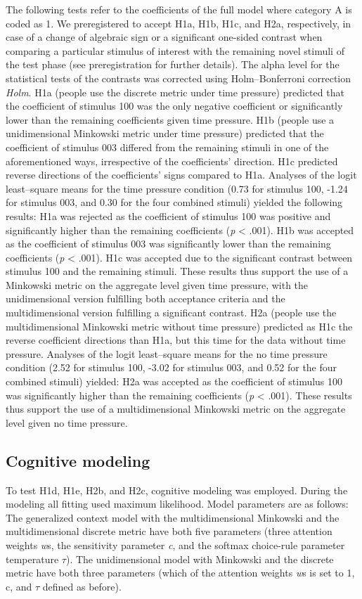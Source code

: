 \documentclass[a4paper,man,natbib]{apa6}
\begin{document}
The following tests refer to the coefficients of the full model where category A is coded as 1. We preregistered to accept H1a, H1b, H1c, and H2a, respectively, in case of a change of algebraic sign or a significant one-sided contrast when comparing a particular stimulus of interest with the remaining novel stimuli of the test phase (see preregistration for further details). The alpha level for the statistical tests of the contrasts was corrected using Holm--Bonferroni correction \textit{Holm}. H1a (people use the discrete metric under time pressure) predicted that the coefficient of stimulus 100 was the only negative coefficient or significantly lower than the remaining coefficients given time pressure. H1b (people use a unidimensional Minkowski metric under time pressure) predicted that the coefficient of stimulus 003 differed from the remaining stimuli in one of the aforementioned ways, irrespective of the coefficients' direction. H1c predicted reverse directions of the coefficients' signs compared to H1a. Analyses of the logit least--square means for the time pressure condition (0.73 for stimulus 100, -1.24 for stimulus 003, and 0.30 for the four combined stimuli) yielded the following results: H1a was rejected as the coefficient of stimulus 100 was positive and significantly higher than the remaining coefficients (\textit{p} < .001). H1b was accepted as the coefficient of stimulus 003 was significantly lower than the remaining coefficients (\textit{p} < .001). H1c was accepted due to the significant contrast between stimulus 100 and the remaining stimuli. These results thus support the use of a Minkowski metric on the aggregate level given time pressure, with the unidimensional version fulfilling both acceptance criteria and the multidimensional version fulfilling a significant contrast. H2a (people use the multidimensional Minkowski metric without time pressure) predicted as H1c the reverse coefficient directions than H1a, but this time for the data without time pressure. Analyses of the logit least--square means for the no time pressure condition (2.52 for stimulus 100, -3.02 for stimulus 003, and 0.52 for the four combined stimuli) yielded: H2a was accepted as the coefficient of stimulus 100 was significantly higher than the remaining coefficients (\textit{p} < .001). These results thus support the use of a multidimensional Minkowski metric on the aggregate level given no time pressure.

\subsection{Cognitive modeling}
To test H1d, H1e, H2b, and H2c, cognitive modeling was employed. During the modeling all fitting used maximum likelihood. Model parameters are as follows: The generalized context model with the multidimensional Minkowski and the multidimensional discrete metric have both five parameters (three attention weights \textit{w}s, the sensitivity parameter \textit{c}, and the softmax choice-rule parameter temperature $\tau$). The unidimensional model with Minkowski and the discrete metric have both three parameters (which of the attention weights \textit{w}s is set to 1, c, and $\tau$ defined as before).
\end{document}
